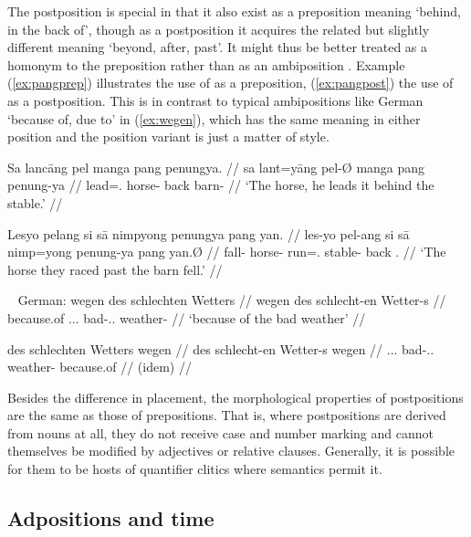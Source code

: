 The postposition  is special in that it also exist as a
preposition meaning `behind, in the back of', though as a postposition it
acquires the related but slightly different meaning `beyond, after, past'. It
might thus be better treated as a homonym to the preposition rather than as an
ambiposition \citep[115]{hagege2010}. Example (\ref{ex:pangprep}) illustrates
the use of  as a preposition, (\ref{ex:pangpost}) the use of
 as a postposition. This is in contrast to typical
ambipositions like German  `because of, due to' in (\ref{ex:wegen}),
which has the same meaning in either position and the position variant is just
a matter of style.

\pex
\a\label{ex:pangprep}\begingl
	\gla Sa lancāng pel manga pang penungya. //
	\glb sa lant=yāng pel-Ø manga pang penung-ya //
	\glc \PatT{} lead=\TsgM{}.\Aarg{} horse-\Top{} \Dir{} back 
		barn-\Loc{} //
	\glft `The horse, he leads it behind the stable.' //
\endgl

\a\label{ex:pangpost}\begingl
	\gla Lesyo pelang si sā nimpyong penungya pang yan. //
	\glb les-yo pel-ang si sā nimp=yong penung-ya pang yan.Ø //
	\glc fall-\TsgN{} horse-\Aarg{} \Rel{} \CauT{} 
		run=\TsgN{}.\Aarg{} stable-\Loc{} back \Tpl{}.\Top{} //
	\glft `The horse they raced past the barn fell.' //
\endgl

\xe

\pex~\label{ex:wegen}%
German:
\a\label{ex:wegenprep}\begingl
	\gla wegen des schlechten Wetters //
	\glb wegen des schlecht-en Wetter-s //
	\glc because.of \Def{}.\Gen{}.\N{}.\Sg{} bad-\Gen{}.\N{}.\Sg{} 
		weather-\Gen{} //
	\glft `because of the bad weather' //
\endgl

\a\label{ex:wegenpost}\begingl
	\gla des schlechten Wetters wegen //
	\glb des schlecht-en Wetter-s wegen //
	\glc \Def{}.\Gen{}.\N{}.\Sg{} bad-\Gen{}.\N{}.\Sg{} weather-\Gen{} 
		because.of //
	\glft (idem) //
\endgl

\xe

Besides the difference in placement, the morphological properties of 
postpositions are the same as those of prepositions. That is, where 
postpositions are derived from nouns at all, they do not receive case and 
number marking and cannot themselves be modified by adjectives or relative 
clauses. Generally, it is possible for them to be hosts of quantifier clitics 
where semantics permit it.


\subsection{Adpositions and time}


